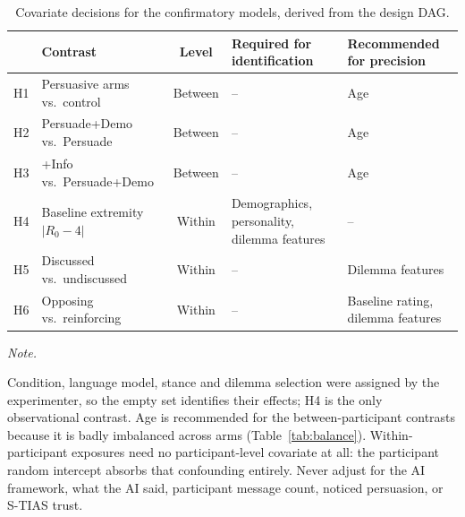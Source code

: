 \begin{table}[!h]
\centering
\caption{\label{tab:dag_adjustment}Covariate decisions for the confirmatory models, derived from the design DAG.}
\centering
\fontsize{9}{11}\selectfont
\begin{threeparttable}
\begin{tabular}[t]{l>{\raggedright\arraybackslash}p{4.3cm}c>{\raggedright\arraybackslash}p{3.3cm}>{\raggedright\arraybackslash}p{3.0cm}}
\toprule
 & Contrast & Level & Required for identification & Recommended for precision\\
\midrule
H1 & Persuasive arms vs.\ control & Between & -- & Age\\
H2 & Persuade+Demo vs.\ Persuade & Between & -- & Age\\
H3 & +Info vs.\ Persuade+Demo & Between & -- & Age\\
H4 & Baseline extremity $|R_0-4|$ & Within & Demographics, personality, dilemma features & --\\
H5 & Discussed vs.\ undiscussed & Within & -- & Dilemma features\\
\addlinespace
H6 & Opposing vs.\ reinforcing & Within & -- & Baseline rating, dilemma features\\
\bottomrule
\end{tabular}
\begin{tablenotes}
\item \textit{Note.} 
\item Condition, language model, stance and dilemma selection were assigned by the experimenter, so the empty set identifies their effects; H4 is the only observational contrast. Age is recommended for the between-participant contrasts because it is badly imbalanced across arms (Table~\ref{tab:balance}). Within-participant exposures need no participant-level covariate at all: the participant random intercept absorbs that confounding entirely. Never adjust for the AI framework, what the AI said, participant message count, noticed persuasion, or S-TIAS trust.
\end{tablenotes}
\end{threeparttable}
\end{table}
